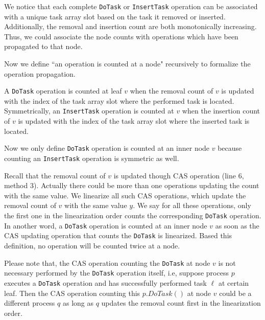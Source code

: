 We notice that each complete \texttt{DoTask} or \texttt{InsertTask} operation can be associated with a unique task array slot based on the task it removed or inserted. Additionally, the removal and insertion count are both monotonically increasing. Thus, we could associate the node counts with operations which have been propagated to that node.

Now we define ``an operation is counted at a node" recursively to formalize the operation propagation.

A \texttt{DoTask} operation is counted at leaf $v$ when the removal count of $v$ is updated with the index of the task array slot where the performed task is located. Symmetrically, an \texttt{InsertTask} operation is counted at $v$ when the insertion count of $v$ is updated with the index of the task array slot where the inserted task is located.

Now we only define \texttt{DoTask} operation is counted at an inner node $v$ because counting an \texttt{InsertTask} operation is symmetric as well.

Recall that the removal count of $v$ is updated though CAS operation (line 6, method 3). Actually there could be more than one operations updating the count with the same value. We linearize all such CAS operations, which update the removal count of $v$ with the same value $y$. We say for all these operations, only the first one in the linearization order counts the corresponding \texttt{DoTask} operation. In another word, a \texttt{DoTask} operation is counted at an inner node $v$ as soon as the CAS updating operation that counts the \texttt{DoTask} is linearized. Based this definition, no operation will be counted twice at a node.

Please note that, the CAS operation counting the \texttt{DoTask} at node $v$ is not necessary performed by the \texttt{DoTask} operation itself, i.e, suppose process $p$ executes a \texttt{DoTask} operation and has successfully performed task $\ell$ at certain leaf. Then the CAS operation counting this $p.DoTask()$ at node $v$ could be a different process $q$ as long as $q$ updates the removal count first in the linearization order.

